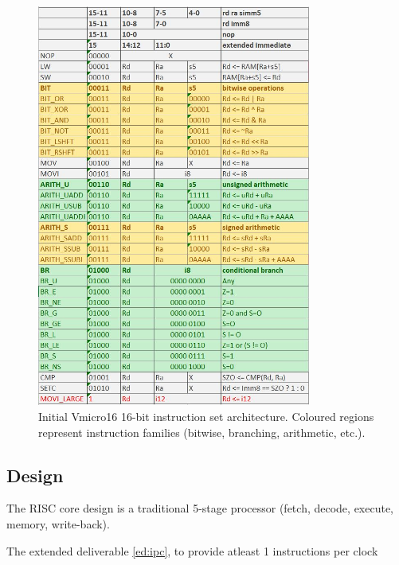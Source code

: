 \documentclass[11pt,a4paper]{report}
\begin{document}
{\begin{figure}[h]
\centering 
\includegraphics[width=9cm]{../img/isa}
\caption{Initial Vmicro16 16-bit instruction set architecture. Coloured regions represent instruction families (bitwise, branching, arithmetic, etc.).}
\label{fig:isa}
\end{figure}

\subsection{Design}
The RISC core design is a traditional 5-stage processor (fetch, decode, execute, memory, write-back).

The extended deliverable \ref{ed:ipc}, to provide atleast 1 instructions per clock

}
\end{document}
